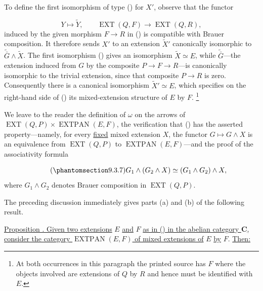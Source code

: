 To define the first isomorphism of type () for $X'$, observe that the
functor

\begin{equation*}
Y\longmapsto\widetilde Y,
\qquad
\operatorname{EXT}(Q,F)\longrightarrow\operatorname{EXT}(Q,R),
\end{equation*}
induced by the given morphism $F\longrightarrow R$ in () is
compatible with Brauer composition. It therefore sends $X'$ to an
extension $\widetilde X'$ canonically isomorphic to
$\widetilde{\bar G}\wedge\widetilde X$. The first isomorphism ()
gives an isomorphism $\widetilde X\simeq E$, while
$\widetilde{\bar G}$---the extension induced from $G$ by the composite
$P\longrightarrow F\longrightarrow R$---is canonically isomorphic to the
trivial extension, since that composite $P\longrightarrow R$ is zero.
Consequently there is a canonical isomorphism
$\widetilde X'\simeq E$, which specifies on the right-hand side of ()
its mixed-extension structure of $E$ by $F$.
\footnote{At both occurrences in this paragraph the printed source has
$F$ where the objects involved are extensions of $Q$ by $R$ and hence must
be identified with $E$.}

We leave to the reader the definition of $\omega$ on the arrows of
$\operatorname{EXT}(Q,P)\times\operatorname{EXTPAN}(E,F)$, the
verification that () has the asserted property---namely, for every
\underline{fixed} mixed extension $X$, the functor
$G\longmapsto G\wedge X$ is an equivalence from
$\operatorname{EXT}(Q,P)$ to $\operatorname{EXTPAN}(E,F)$---and the proof
of the associativity formula

\begin{equation}\tag{\SGARefTarget{sga7.sga7i.eix.n9-3-7}{9.3.7}}
G_1\wedge(G_2\wedge X)
 \simeq (G_1\wedge G_2)\wedge X,
\end{equation}
where $G_1\wedge G_2$ denotes Brauer composition in
$\operatorname{EXT}(Q,P)$.

The preceding discussion immediately gives parts (a) and (b) of the
following result.

\medskip
\noindent
\underline{Proposition . Given two extensions} $E$ \underline{and} $F$ \underline{as in
() in the abelian category $\mathbf C$, consider the category
$\operatorname{EXTPAN}(E,F)$ of mixed extensions of} $E$ \underline{by} $F$. \underline{Then:}

